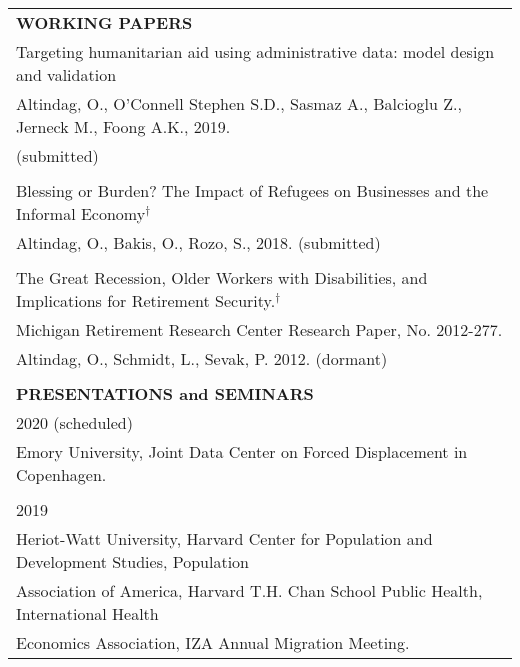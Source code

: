 \documentclass[12 pt]{article}
\begin{document}
\begin{longtable}{ccccc}
\\


\multicolumn{5}{l}{\textbf{WORKING PAPERS}}\\[2 pt]

 \multicolumn{5}{l}{Targeting humanitarian aid using administrative data: model design and validation} \\ 
  \multicolumn{5}{l}{Altindag, O., O'Connell Stephen S.D., Sasmaz A., Balcioglu Z., Jerneck M., Foong A.K., 2019.} \\
\multicolumn{5}{l}{(submitted)} \\ 
 
\\
  \multicolumn{5}{l}{Blessing or Burden? The Impact of Refugees on Businesses and the Informal Economy$^{\dagger}$} \\

  \multicolumn{5}{l}{Altindag, O., Bakis, O., Rozo, S., 2018. (submitted)} \\
  




\\






\multicolumn{5}{l}{The Great Recession, Older Workers with Disabilities, and Implications for Retirement Security.$^{\dagger}$} \\
\multicolumn{5}{l}{Michigan Retirement Research Center Research Paper, No. 2012-277.} \\
\multicolumn{5}{l}{Altindag, O., Schmidt, L., Sevak, P. 2012. (dormant) } \\
\\


 
 

 \multicolumn{5}{l}{\textbf{PRESENTATIONS and SEMINARS}}\\[2 pt]
 
   \multicolumn{5}{l}{2020 (scheduled)}\\
  \multicolumn{5}{l}{Emory University, Joint Data Center on Forced Displacement in Copenhagen.} \\

\\
  \multicolumn{5}{l}{2019}\\
   \multicolumn{5}{l}{Heriot-Watt University, Harvard Center for Population and Development Studies, Population} \\
 \multicolumn{5}{l}{Association of America, Harvard T.H. Chan School Public Health, International Health} \\
  \multicolumn{5}{l}{Economics Association, IZA Annual Migration Meeting.} \\


\end{longtable}
\end{document}
